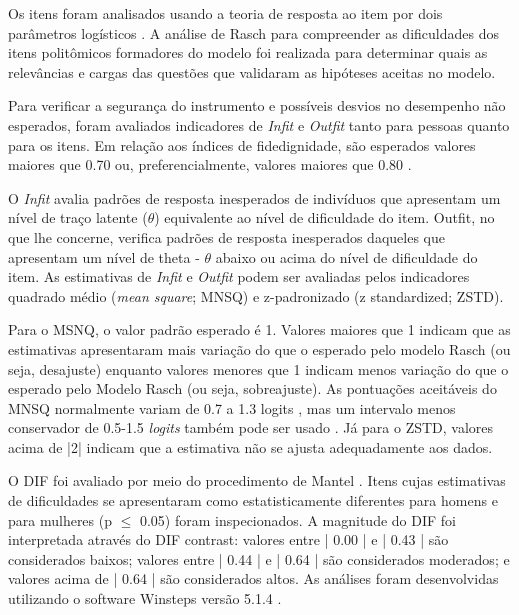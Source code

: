 Os itens foram analisados usando a teoria de resposta ao item por dois parâmetros logísticos \cite{Andrich1978ACategories}. A análise de Rasch para compreender as dificuldades dos itens politômicos formadores do modelo foi realizada para determinar quais as relevâncias e cargas das questões que validaram as hipóteses aceitas no modelo.

Para verificar a segurança do instrumento e possíveis desvios no desempenho não esperados, foram avaliados indicadores de \textit{Infit} e \textit{Outfit} tanto para pessoas quanto para os itens. Em relação aos índices de fidedignidade, são esperados valores maiores que 0.70 ou, preferencialmente, valores maiores que 0.80 \cite{Linacre2012WinstepsGuide}.

O \textit{Infit} avalia padrões de resposta inesperados de indivíduos que apresentam um nível de traço latente ($\theta$) equivalente ao nível de dificuldade do item. Outfit, no que lhe concerne, verifica padrões de resposta inesperados daqueles que apresentam um nível de theta - $\theta$ abaixo ou acima do nível de dificuldade do item. As estimativas de \textit{Infit} e \textit{Outfit} podem ser avaliadas pelos indicadores quadrado médio (\textit{mean square}; MNSQ) e z-padronizado (z standardized; ZSTD). 

Para o MSNQ, o valor padrão esperado é 1. Valores maiores que 1 indicam que as estimativas apresentaram mais variação do que o esperado pelo modelo Rasch (ou seja, desajuste) enquanto valores menores que 1 indicam menos variação do que o esperado pelo Modelo Rasch (ou seja, sobreajuste). As pontuações aceitáveis do MNSQ normalmente variam de 0.7 a 1.3 logits \cite{Boone2016RaschHow,Bond2020ApplyingSciences}, mas um intervalo menos conservador de 0.5-1.5 \textit{logits} também pode ser usado \cite{Wright1994ReasonableTransactions}. Já para o ZSTD, valores acima de |2| indicam que a estimativa não se ajusta adequadamente aos dados.

O DIF foi avaliado por meio do procedimento de Mantel \cite{Bond2020ApplyingSciences}. Itens cujas estimativas de dificuldades se apresentaram como estatisticamente diferentes para homens e para mulheres (p $\leq$ 0.05) foram inspecionados. A magnitude do DIF foi interpretada através do DIF contrast: valores entre | 0.00 | e | 0.43 | são considerados baixos; valores entre | 0.44 | e | 0.64 | são considerados moderados; e valores acima de | 0.64 | são considerados altos. As análises foram desenvolvidas utilizando o software Winsteps versão 5.1.4 \cite{Linacre2012WinstepsGuide}.



